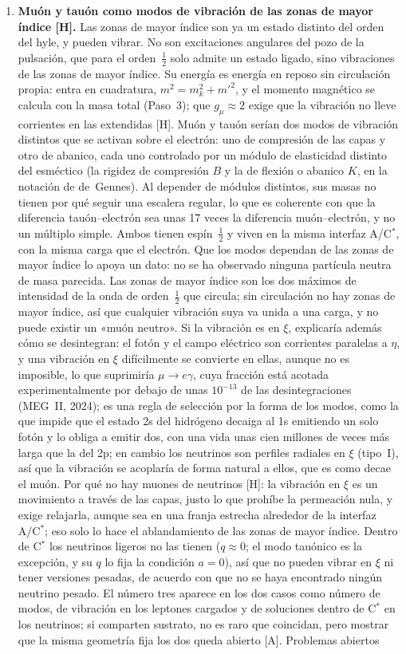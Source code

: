\documentclass[11pt,a4paper]{article}
\newcommand{\st}[1]{\textup{[#1]}}
\newcommand{\Cst}{C\ensuremath{^{*}}}
\begin{document}
\begin{enumerate}[label=\arabic*.,ref=\arabic*,leftmargin=*]
\item \label{ab:muon}\textbf{Muón y tauón como modos de vibración de las zonas de mayor índice \st{H}.} Las zonas de mayor índice son ya un estado distinto del orden del hyle, y pueden vibrar. No son excitaciones angulares del pozo de la pulsación, que para el orden~$\tfrac12$ solo admite un estado ligado, sino vibraciones de las zonas de mayor índice. Su energía es energía en reposo sin circulación propia: entra en cuadratura, $m^2=m_k^2+m'^2$, y el momento magnético se calcula con la masa total (Paso~3); que $g_\mu\approx2$ exige que la vibración no lleve corrientes en las extendidas \st{H}. Muón y tauón serían dos modos de vibración distintos que se activan sobre el electrón: uno de compresión de las capas y otro de abanico, cada uno controlado por un módulo de elasticidad distinto del esméctico (la rigidez de compresión $B$ y la de flexión o abanico $K$, en la notación de de~Gennes). Al depender de módulos distintos, sus masas no tienen por qué seguir una escalera regular, lo que es coherente con que la diferencia tauón--electrón sea unas 17 veces la diferencia muón--electrón, y no un múltiplo simple. Ambos tienen espín~$\tfrac12$ y viven en la misma interfaz A/\Cst, con la misma carga que el electrón. Que los modos dependan de las zonas de mayor índice lo apoya un dato: no se ha observado ninguna partícula neutra de masa parecida. Las zonas de mayor índice son los dos máximos de intensidad de la onda de orden~$\tfrac12$ que circula; sin circulación no hay zonas de mayor índice, así que cualquier vibración suya va unida a una carga, y no puede existir un «muón neutro». Si la vibración es en $\xi$, explicaría además cómo se desintegran: el fotón y el campo eléctrico son corrientes paralelas a $\eta$, y una vibración en $\xi$ difícilmente se convierte en ellas, aunque no es imposible, lo que suprimiría $\mu\to e\gamma$, cuya fracción está acotada experimentalmente por debajo de unas $10^{-13}$ de las desintegraciones (MEG~II, 2024); es una regla de selección por la forma de los modos, como la que impide que el estado 2s del hidrógeno decaiga al 1s emitiendo un solo fotón y lo obliga a emitir dos, con una vida unas cien millones de veces más larga que la del 2p; en cambio los neutrinos son perfiles radiales en $\xi$ (tipo~I), así que la vibración se acoplaría de forma natural a ellos, que es como decae el muón. Por qué no hay muones de neutrinos \st{H}: la vibración en $\xi$ es un movimiento a través de las capas, justo lo que prohíbe la permeación nula, y exige relajarla, aunque sea en una franja estrecha alrededor de la interfaz A/\Cst; eso solo lo hace el ablandamiento de las zonas de mayor índice. Dentro de \Cst{} los neutrinos ligeros no las tienen ($q\approx0$; el modo tauónico es la excepción, y su $q$ lo fija la condición $a=0$), así que no pueden vibrar en $\xi$ ni tener versiones pesadas, de acuerdo con que no se haya encontrado ningún neutrino pesado. El número tres aparece en los dos casos como número de modos, de vibración en los leptones cargados y de soluciones dentro de \Cst{} en los neutrinos; si comparten sustrato, no es raro que coincidan, pero mostrar que la misma geometría fija los dos queda abierto \st{A}. Problemas abiertos 
\end{enumerate}
\end{document}

